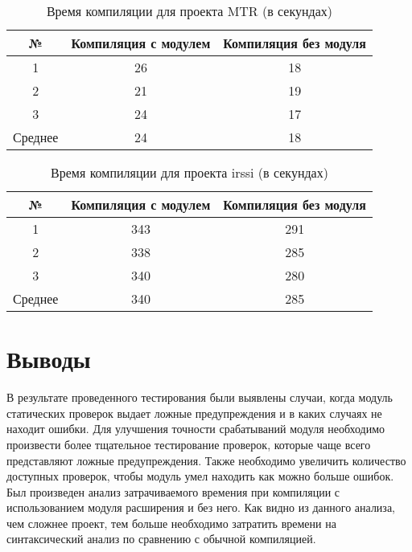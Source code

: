 \begin{table}[h!]
\caption{Время компиляции для проекта MTR (в секундах)}
\label{table:mtrTable}
\centering
\begin{tabular}{| c | c | c |}
\hline
№ & Компиляция с модулем & Компиляция без модуля \\
\hline
1 & 26 & 18 \\
2 & 21 & 19 \\
3 & 24 & 17 \\
Среднее & 24 & 18 \\
\hline
\end{tabular}
\end{table}

\begin{table}[h!]
\caption{Время компиляции для проекта irssi (в секундах)}
\label{table:irssiTable}
\centering
\begin{tabular}{| c | c | c |}
\hline
№ & Компиляция с модулем & Компиляция без модуля \\
\hline
1 & 343 & 291 \\
2 & 338 & 285 \\
3 & 340 & 280 \\
Среднее & 340 & 285 \\
\hline
\end{tabular}
\end{table}

\section{Выводы}
В результате проведенного тестирования были выявлены случаи, когда модуль статических проверок
выдает ложные предупреждения и в каких случаях не находит ошибки. Для улучшения точности срабатываний модуля 
необходимо произвести более тщательное тестирование проверок, которые чаще всего представляют ложные 
предупреждения. Также необходимо увеличить количество доступных проверок, чтобы модуль умел находить
как можно больше ошибок. Был произведен анализ затрачиваемого времения при компиляции с использованием 
модуля расширения и без него. Как видно из данного анализа, чем сложнее проект, тем больше
необходимо затратить времени на синтаксический анализ по сравнению с обычной компиляцией.
